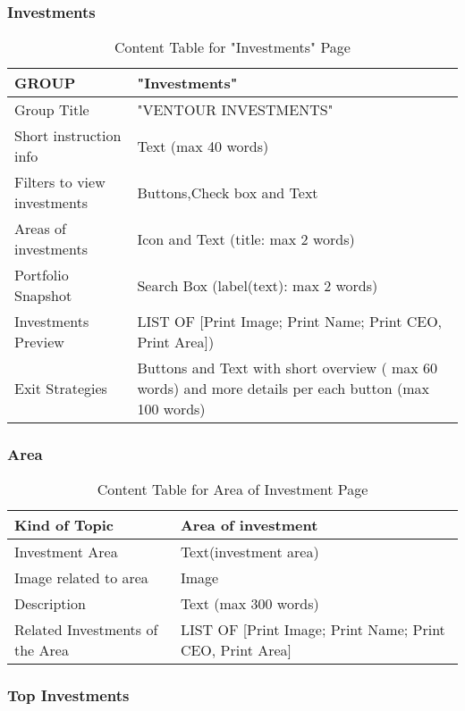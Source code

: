\documentclass[../../DD.tex]{subfiles}
\begin{document}
    \subsubsection{Investments}
 \begin{table}[h]
    \begin{tabular}{ |l|p{}| }
    \hline
    GROUP & "Investments"\\
    \hline
    Group Title & "VENTOUR INVESTMENTS" \\
    \hline
    Short instruction info & Text (max 40 words) \\
    \hline
    Filters to view investments & Buttons,Check box and Text\\
    \hline
    Areas of investments & Icon and Text (title: max 2 words) \\
    \hline
   Portfolio Snapshot & Search Box (label(text): max 2 words) \\
    \hline
   Investments Preview & LIST OF [Print Image; Print Name; Print CEO, Print Area]) \\
    \hline
   Exit Strategies & Buttons and Text with short overview ( max 60 words) and more details per each button (max 100 words) \\
    \hline
\end{tabular}
\caption{Content Table for "Investments" Page}
\end{table}  

    \subsubsection{Area}
        \begin{table}[h]
    \begin{tabular}{ |l|p{}| }
    \hline
    Kind of Topic & Area of investment\\
    \hline
    Investment Area & Text(investment area) \\
    \hline
    Image related to area & Image\\
    \hline
    Description  & Text (max 300 words)\\
    \hline
    Related Investments of the Area & LIST OF [Print Image; Print Name; Print CEO, Print Area] \\
    \hline
\end{tabular}
\caption{Content Table for Area of Investment Page}
\end{table}
\subsubsection{Top Investments}
\end{document}

